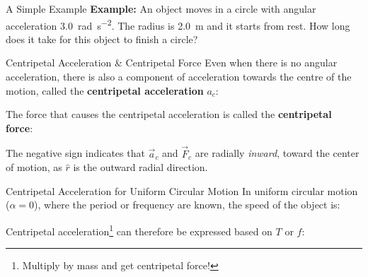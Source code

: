 \documentclass[12pt,compress,aspectratio=169]{beamer}
\begin{document}
\begin{frame}{A Simple Example}
  \textbf{Example:} An object moves in a circle with angular acceleration
  \SI{3.0}{\radian\per\second\squared}. The radius is \SI{2.0}{\metre} and it
  starts from rest. How long does it take for this object to finish a circle?
\end{frame}



\begin{frame}{Centripetal Acceleration \& Centripetal Force}
  Even when there is no angular acceleration, there is also a component of
  acceleration towards the centre of the motion, called the
  \textbf{centripetal acceleration} $a_c$:


  The force that causes the centripetal acceleration is
  called the \textbf{centripetal force}:


  The negative sign indicates that $\vec a_c$ and $\vec F_c$ are radially
  \emph{inward}, toward the center of motion, as $\hat r$ is the outward radial
  direction.
\end{frame}



\begin{frame}{Centripetal Acceleration for Uniform Circular Motion}
  In uniform circular motion ($\alpha=0$), where the period or frequency are
  known, the speed of the object is:


  Centripetal acceleration\footnote{Multiply by mass and get centripetal
  force!} can therefore be expressed based on $T$ or $f$:

\end{frame}
\end{document}
